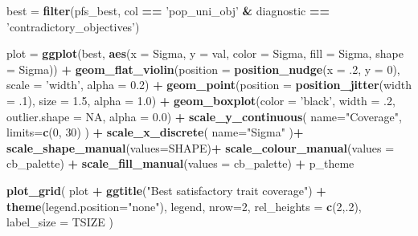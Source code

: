 \documentclass[]{book}
\newenvironment{Shaded}{\begin{snugshade}}{\end{snugshade}}
\newcommand{\DataTypeTok}[1]{\textcolor[rgb]{0.13,0.29,0.53}{#1}}
\newcommand{\DecValTok}[1]{\textcolor[rgb]{0.00,0.00,0.81}{#1}}
\newcommand{\FloatTok}[1]{\textcolor[rgb]{0.00,0.00,0.81}{#1}}
\newcommand{\KeywordTok}[1]{\textcolor[rgb]{0.13,0.29,0.53}{\textbf{#1}}}
\newcommand{\NormalTok}[1]{#1}
\newcommand{\OperatorTok}[1]{\textcolor[rgb]{0.81,0.36,0.00}{\textbf{#1}}}
\newcommand{\OtherTok}[1]{\textcolor[rgb]{0.56,0.35,0.01}{#1}}
\newcommand{\StringTok}[1]{\textcolor[rgb]{0.31,0.60,0.02}{#1}}
\begin{document}
\begin{Shaded}
\begin{Highlighting}[]
\NormalTok{best =}\StringTok{ }\KeywordTok{filter}\NormalTok{(pfs_best, col }\OperatorTok{==}\StringTok{ 'pop_uni_obj'} \OperatorTok{&}\StringTok{ }\NormalTok{diagnostic }\OperatorTok{==}\StringTok{ 'contradictory_objectives'}\NormalTok{)}

\NormalTok{plot =}\StringTok{ }\KeywordTok{ggplot}\NormalTok{(best, }\KeywordTok{aes}\NormalTok{(}\DataTypeTok{x =}\NormalTok{ Sigma, }\DataTypeTok{y =}\NormalTok{ val, }\DataTypeTok{color =}\NormalTok{ Sigma, }\DataTypeTok{fill =}\NormalTok{ Sigma, }\DataTypeTok{shape =}\NormalTok{ Sigma)) }\OperatorTok{+}
\StringTok{  }\KeywordTok{geom_flat_violin}\NormalTok{(}\DataTypeTok{position =} \KeywordTok{position_nudge}\NormalTok{(}\DataTypeTok{x =} \FloatTok{.2}\NormalTok{, }\DataTypeTok{y =} \DecValTok{0}\NormalTok{), }\DataTypeTok{scale =} \StringTok{'width'}\NormalTok{, }\DataTypeTok{alpha =} \FloatTok{0.2}\NormalTok{) }\OperatorTok{+}
\StringTok{  }\KeywordTok{geom_point}\NormalTok{(}\DataTypeTok{position =} \KeywordTok{position_jitter}\NormalTok{(}\DataTypeTok{width =} \FloatTok{.1}\NormalTok{), }\DataTypeTok{size =} \FloatTok{1.5}\NormalTok{, }\DataTypeTok{alpha =} \FloatTok{1.0}\NormalTok{) }\OperatorTok{+}
\StringTok{  }\KeywordTok{geom_boxplot}\NormalTok{(}\DataTypeTok{color =} \StringTok{'black'}\NormalTok{, }\DataTypeTok{width =} \FloatTok{.2}\NormalTok{, }\DataTypeTok{outlier.shape =} \OtherTok{NA}\NormalTok{, }\DataTypeTok{alpha =} \FloatTok{0.0}\NormalTok{) }\OperatorTok{+}
\StringTok{  }\KeywordTok{scale_y_continuous}\NormalTok{(}
    \DataTypeTok{name=}\StringTok{"Coverage"}\NormalTok{,}
    \DataTypeTok{limits=}\KeywordTok{c}\NormalTok{(}\DecValTok{0}\NormalTok{, }\DecValTok{30}\NormalTok{)}
\NormalTok{  ) }\OperatorTok{+}
\StringTok{  }\KeywordTok{scale_x_discrete}\NormalTok{(}
    \DataTypeTok{name=}\StringTok{"Sigma"}
\NormalTok{  )}\OperatorTok{+}
\StringTok{  }\KeywordTok{scale_shape_manual}\NormalTok{(}\DataTypeTok{values=}\NormalTok{SHAPE)}\OperatorTok{+}
\StringTok{  }\KeywordTok{scale_colour_manual}\NormalTok{(}\DataTypeTok{values =}\NormalTok{ cb_palette) }\OperatorTok{+}
\StringTok{  }\KeywordTok{scale_fill_manual}\NormalTok{(}\DataTypeTok{values =}\NormalTok{ cb_palette) }\OperatorTok{+}
\StringTok{  }\NormalTok{p_theme}

\KeywordTok{plot_grid}\NormalTok{(}
\NormalTok{  plot }\OperatorTok{+}
\StringTok{    }\KeywordTok{ggtitle}\NormalTok{(}\StringTok{"Best satisfactory trait coverage"}\NormalTok{) }\OperatorTok{+}
\StringTok{    }\KeywordTok{theme}\NormalTok{(}\DataTypeTok{legend.position=}\StringTok{"none"}\NormalTok{),}
\NormalTok{  legend,}
  \DataTypeTok{nrow=}\DecValTok{2}\NormalTok{,}
  \DataTypeTok{rel_heights =} \KeywordTok{c}\NormalTok{(}\DecValTok{2}\NormalTok{,.}\DecValTok{2}\NormalTok{),}
  \DataTypeTok{label_size =}\NormalTok{ TSIZE}
\NormalTok{)}
\end{Highlighting}
\end{Shaded}
\end{document}
